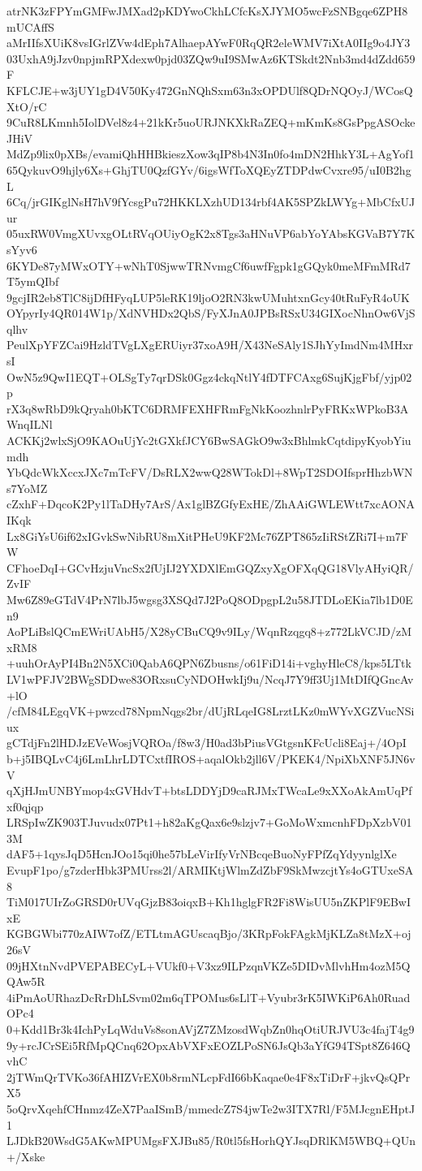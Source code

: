 atrNK3zFPYmGMFwJMXad2pKDYwoCkhLCfcKsXJYMO5wcFzSNBgqe6ZPH8mUCAffS
aMrIIfsXUiK8vsIGrlZVw4dEph7AlhaepAYwF0RqQR2eleWMV7iXtA0IIg9o4JY3
03UxhA9jJzv0npjmRPXdexw0pjd03ZQw9uI9SMwAz6KTSkdt2Nnb3md4dZdd659F
KFLCJE+w3jUY1gD4V50Ky472GnNQhSxm63n3xOPDUlf8QDrNQOyJ/WCosQXtO/rC
9CuR8LKmnh5IolDVel8z4+21kKr5uoURJNKXkRaZEQ+mKmKs8GsPpgASOckeJHiV
MdZp9lix0pXBs/evamiQhHHBkieszXow3qIP8b4N3In0fo4mDN2HhkY3L+AgYof1
65QykuvO9hjly6Xs+GhjTU0QzfGYv/6igsWfToXQEyZTDPdwCvxre95/uI0B2hgL
6Cq/jrGIKglNsH7hV9fYcsgPu72HKKLXzhUD134rbf4AK5SPZkLWYg+MbCfxUJur
05uxRW0VmgXUvxgOLtRVqOUiyOgK2x8Tgs3aHNuVP6abYoYAbsKGVaB7Y7KsYyv6
6KYDe87yMWxOTY+wNhT0SjwwTRNvmgCf6uwfFgpk1gGQyk0meMFmMRd7T5ymQIbf
9gcjIR2eb8TlC8ijDfHFyqLUP5leRK19ljoO2RN3kwUMuhtxnGcy40tRuFyR4oUK
OYpyrIy4QR014W1p/XdNVHDx2QbS/FyXJnA0JPBsRSxU34GIXocNhnOw6VjSqlhv
PeulXpYFZCai9HzldTVgLXgERUiyr37xoA9H/X43NeSAly1SJhYyImdNm4MHxrsI
OwN5z9QwI1EQT+OLSgTy7qrDSk0Ggz4ckqNtlY4fDTFCAxg6SujKjgFbf/yjp02p
rX3q8wRbD9kQryah0bKTC6DRMFEXHFRmFgNkKoozhnlrPyFRKxWPkoB3AWnqILNl
ACKKj2wlxSjO9KAOuUjYc2tGXkfJCY6BwSAGkO9w3xBhlmkCqtdipyKyobYiumdh
YbQdcWkXccxJXc7mTcFV/DsRLX2wwQ28WTokDl+8WpT2SDOIfsprHhzbWNs7YoMZ
cZxhF+DqcoK2Py1lTaDHy7ArS/Ax1glBZGfyExHE/ZhAAiGWLEWtt7xcAONAIKqk
Lx8GiYsU6if62xIGvkSwNibRU8mXitPHeU9KF2Mc76ZPT865zIiRStZRi7I+m7FW
CFhoeDqI+GCvHzjuVncSx2fUjIJ2YXDXlEmGQZxyXgOFXqQG18VlyAHyiQR/ZvIF
Mw6Z89eGTdV4PrN7lbJ5wgsg3XSQd7J2PoQ8ODpgpL2u58JTDLoEKia7lb1D0En9
AoPLiBslQCmEWriUAbH5/X28yCBuCQ9v9ILy/WqnRzqgq8+z772LkVCJD/zMxRM8
+uuhOrAyPI4Bn2N5XCi0QabA6QPN6Zbusns/o61FiD14i+vghyHleC8/kps5LTtk
LV1wPFJV2BWgSDDwe83ORxsuCyNDOHwkIj9u/NcqJ7Y9ff3Uj1MtDIfQGncAv+lO
/cfM84LEgqVK+pwzcd78NpmNqgs2br/dUjRLqeIG8LrztLKz0mWYvXGZVucNSiux
gCTdjFn2lHDJzEVeWosjVQROa/f8w3/H0ad3bPiusVGtgsnKFcUcli8Eaj+/4OpI
b+j5IBQLvC4j6LmLhrLDTCxtfIROS+aqalOkb2jll6V/PKEK4/NpiXbXNF5JN6vV
qXjHJmUNBYmop4xGVHdvT+btsLDDYjD9caRJMxTWcaLe9xXXoAkAmUqPfxf0qjqp
LRSpIwZK903TJuvudx07Pt1+h82aKgQax6e9slzjv7+GoMoWxmcnhFDpXzbV013M
dAF5+1qysJqD5HcnJOo15qi0he57bLeVirIfyVrNBcqeBuoNyFPfZqYdyynlglXe
EvupF1po/g7zderHbk3PMUrss2l/ARMIKtjWlmZdZbF9SkMwzcjtYs4oGTUxeSA8
TiM017UIrZoGRSD0rUVqGjzB83oiqxB+Kh1hglgFR2Fi8WisUU5nZKPlF9EBwIxE
KGBGWbi770zAIW7ofZ/ETLtmAGUscaqBjo/3KRpFokFAgkMjKLZa8tMzX+oj26sV
09jHXtnNvdPVEPABECyL+VUkf0+V3xz9ILPzqnVKZe5DIDvMlvhHm4ozM5QQAw5R
4iPmAoURhazDcRrDhLSvm02m6qTPOMus6sLlT+Vyubr3rK5IWKiP6Ah0RuadOPc4
0+Kdd1Br3k4IchPyLqWduVs8sonAVjZ7ZMzosdWqbZn0hqOtiURJVU3c4fajT4g9
9y+rcJCrSEi5RfMpQCnq62OpxAbVXFxEOZLPoSN6JsQb3aYfG94TSpt8Z646QvhC
2jTWmQrTVKo36fAHIZVrEX0b8rmNLcpFdI66bKaqae0e4F8xTiDrF+jkvQsQPrX5
5oQrvXqehfCHnmz4ZeX7PaaISmB/mmedcZ7S4jwTe2w3ITX7Rl/F5MJcgnEHptJ1
LJDkB20WsdG5AKwMPUMgsFXJBu85/R0tl5fsHorhQYJsqDRlKM5WBQ+QUn+/Xske
